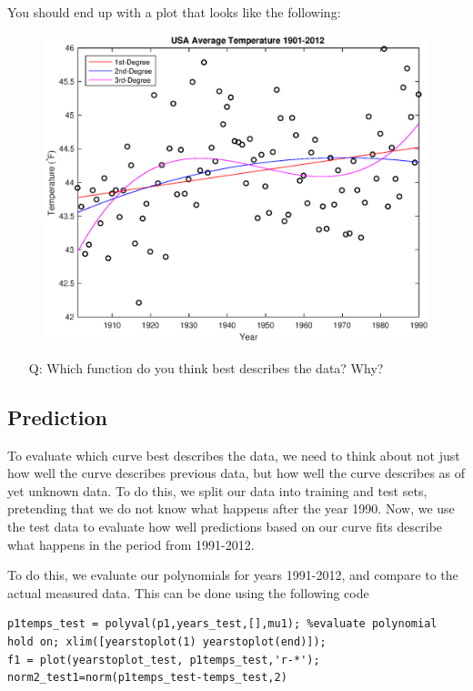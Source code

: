 \documentclass[12pt]{article}
\begin{document}
You should end up with a plot that looks like the following:

\begin{figure}[H]
\centering
\includegraphics[width=0.75\linewidth]{matlab/dataTemp/tempVsYearTrain.eps}
\end{figure}

\begin{enumerate}
\item[Q:] Which function do you think best describes the data? Why?
\end{enumerate}

\subsection{Prediction}
To evaluate which curve best describes the data, we need to think about not just how well the curve describes previous data, but how well the curve describes as of yet unknown data. To do this, we split our data into training and test sets, pretending that we do not know what happens after the year 1990. Now, we use the test data to evaluate how well predictions based on our curve fits describe what happens in the period from 1991-2012. 

To do this, we evaluate our polynomials for years 1991-2012, and compare to the actual measured data. This can be done using the following code

\begin{lstlisting}[frame=single]
%test 1-degree polynomial
p1temps_test = polyval(p1,years_test,[],mu1); %evaluate polynomial
hold on; xlim([yearstoplot(1) yearstoplot(end)]);
f1 = plot(yearstoplot_test, p1temps_test,'r-*');
norm2_test1=norm(p1temps_test-temps_test,2)
\end{lstlisting}
\end{document}
